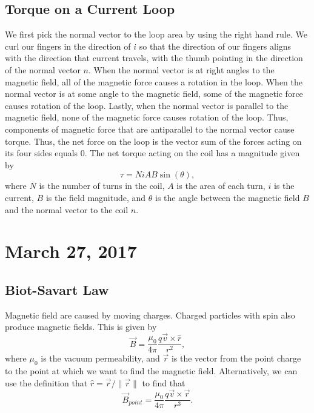 \documentclass[11pt]{article}
\theoremstyle{plain} %
\theoremstyle{definition}
\theoremstyle{example}
\theoremstyle{remark}
\begin{document}
\subsection{Torque on a Current Loop}
We first pick the normal vector to the loop area by using the right hand rule. We curl our fingers in the direction of $i$ so that the direction of our fingers aligns with the direction that current travels, with the thumb pointing in the direction of the normal vector $n$. When the normal vector is at right angles to the magnetic field, all of the magnetic force causes a rotation in the loop. When the normal vector is at some angle to the magnetic field, some of the magnetic force causes rotation of the loop. Lastly, when the normal vector is parallel to the magnetic field, none of the magnetic force causes rotation of the loop. Thus, components of magnetic force that are antiparallel to the normal vector cause torque. Thus, the net force on the loop is the vector sum of the forces acting on its four sides equals 0. The net torque acting on the coil has a magnitude given by 
$$\tau = NiAB\sin(\theta),$$
where $N$ is the number of turns in the coil, $A$ is the area of each turn, $i$ is the current, $B$ is the field magnitude, and $\theta$ is the angle between the magnetic field $B$ and the normal vector to the coil $n$. 



\section{March 27, 2017}
\subsection{Biot-Savart Law}

Magnetic field are caused by moving charges. Charged particles with spin also produce magnetic fields. This is given by 
$$\vec{B} = \frac{\mu_0}{4\pi}\frac{q\vec{v} \times \hat{r}}{r^2},$$
where $\mu_0$ is the vacuum permeability, and $\vec{r}$ is the vector from the point charge to the point at which we want to find the magnetic field. 
Alternatively, we can use the definition that $\hat{r} = \vec{r}/\|\vec{r}\|$ to find that 
$$\vec{B}_{point} = \frac{\mu_0}{4\pi}\frac{q\vec{v}\times \vec{r}}{r^3}.$$
\end{document}
